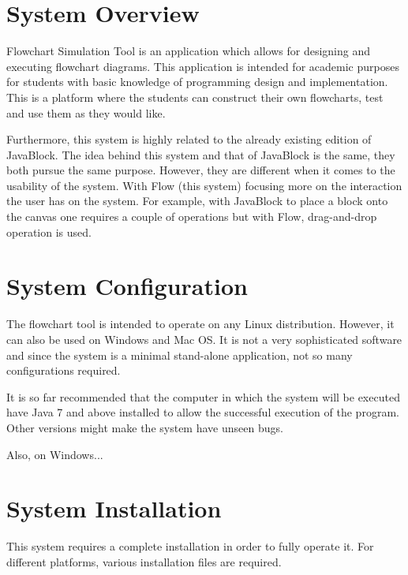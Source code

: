 \documentclass[11pt,a4paper,titlepage]{article}
\begin{document}

\newpage
\tableofcontents
{}
\newpage
{}
\section{System Overview}
	
		Flowchart Simulation Tool is an application which allows for designing and executing flowchart diagrams. This application is intended for academic purposes for students with basic knowledge of programming design and implementation. This is a platform where the students can construct their own flowcharts, test and use them as they would like. \newline
		
		Furthermore, this system is highly related to the already existing edition of JavaBlock. The idea behind this system and that of JavaBlock is the same, they both pursue the same purpose. However, they are different when it comes to the usability of the system. With Flow (this system) focusing more on the interaction the user has on the system. For example, with JavaBlock to place a block onto the canvas one requires a couple of operations but with Flow, drag-and-drop operation is used. 
		
\section{System Configuration}
		
		
		The flowchart tool is intended to operate on any Linux distribution. However, it can also be used on Windows and Mac OS. It is not a very sophisticated software and since the system is a minimal stand-alone application, not so many configurations required. 
		
		It is so far recommended that the computer in which the system will be executed have Java 7 and above installed to allow the successful execution of the program. Other versions might make the system have unseen bugs.
		
		Also, on Windows...
		
\section{System Installation}
		
		This system requires a complete installation in order to fully operate it. For different platforms, various installation files are required. \newline
		
\end{document}
